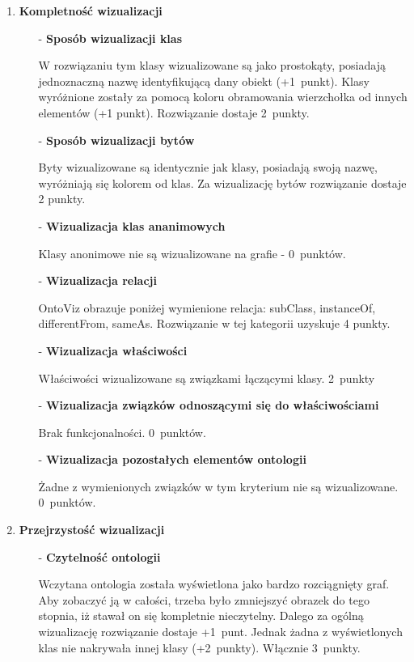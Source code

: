 \begin{enumerate}
 \item{\bf Kompletność wizualizacji}

  \begin{itemize}
   \item[-]{\bf Sposób wizualizacji klas}

  \nopagebreak  
    W rozwiązaniu tym klasy wizualizowane są jako prostokąty, posiadają jednoznaczną nazwę identyfikującą dany obiekt (+1~punkt).
Klasy wyróżnione zostały za pomocą koloru obramowania wierzchołka od innych elementów (+1 punkt).
  Rozwiązanie dostaje  2~punkty.

   \item[-]{\bf Sposób wizualizacji bytów}

  \nopagebreak 
Byty wizualizowane są identycznie jak klasy, posiadają swoją  nazwę, wyróżniają się kolorem od klas. Za wizualizację bytów rozwiązanie 
dostaje 2 punkty.
   \item[-]{\bf Wizualizacja klas ananimowych}

  \nopagebreak 
Klasy anonimowe nie są wizualizowane na grafie - 0~punktów.  

   \item[-]{\bf Wizualizacja relacji}

  \nopagebreak 
OntoViz obrazuje poniżej wymienione relacja: subClass, instanceOf, differentFrom, sameAs. 
Rozwiązanie w tej kategorii uzyskuje 4 punkty. 


 \item[-]{\bf Wizualizacja właściwości} 

  \nopagebreak
Właściwości wizualizowane są związkami łączącymi klasy. 2~punkty
 \item[-]{\bf Wizualizacja związków odnoszącymi się do właściwościami} 

  \nopagebreak
Brak funkcjonalności. 0~punktów.
 \item[-]{\bf Wizualizacja pozostałych elementów ontologii} 

  \nopagebreak
Żadne z wymienionych związków w tym kryterium nie są wizualizowane. 0~punktów.
  \end{itemize}

\item{\bf Przejrzystość wizualizacji}
\begin{itemize}
 \item[-]{\bf Czytelność ontologii} 

  \nopagebreak
Wczytana ontologia została wyświetlona jako bardzo rozciągnięty graf. Aby zobaczyć ją w całości, trzeba było zmniejszyć obrazek do 
tego stopnia, iż stawał on się kompletnie nieczytelny. Dalego za ogólną wizualizację rozwiązanie dostaje +1~punt. Jednak żadna z wyświetlonych 
klas nie nakrywała innej klasy (+2~punkty). Włącznie 3~punkty.


\end{itemize}
\end{enumerate}
